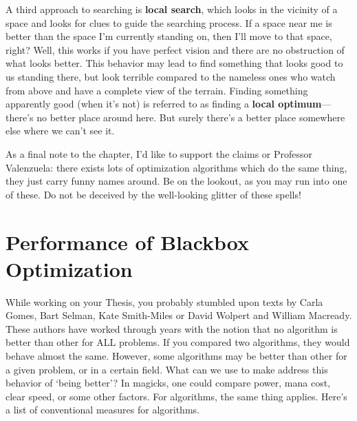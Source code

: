\documentclass[titlepage, letterpaper, oneside]{book}
\newcommand{\spacepls}{\vspace{5mm}}
\newcommand{\magicword}[1]{%
\textbf{#1}\marginnote{\textfrak{#1}}}
\begin{document}
A third approach to searching is \magicword{local search}, which looks in the vicinity of a space and looks for clues to guide the searching process.
If a space near me is better than the space I'm currently standing on, then I'll move to that space, right?
Well, this works if you have perfect vision and there are no obstruction of what looks better.
This behavior may lead to find something that looks good to us standing there, but look terrible compared to the nameless ones who watch from above and have a complete view of the terrain.
Finding something apparently good (when it's not) is referred to as finding a \magicword{local optimum}---there's no better place around here.
But surely there's a better place somewhere else where we can't see it.

As a final note to the chapter, I'd like to support the claims or Professor Valenzuela: there exists lots of optimization algorithms which do the same thing, they just carry funny names around.
Be on the lookout, as you may run into one of these.
Do not be deceived by the well-looking glitter of these spells!

\spacepls

\begin{center}
{\huge \staveXXIII}	
\end{center}



\chapter{Performance of Blackbox Optimization}
\label{ch:blackbox-performance}

While working on your Thesis, you probably stumbled upon texts by Carla Gomes, Bart Selman, Kate Smith-Miles or David Wolpert and William Macready.
These authors have worked through years with the notion that no algorithm is better than other for ALL problems.
If you compared two algorithms, they would behave almost the same.
However, some algorithms may be better than other for a given problem, or in a certain field.
What can we use to make address this behavior of `being better'?
In magicks, one could compare power, mana cost, clear speed, or some other factors.
For algorithms, the same thing applies.
Here's a list of conventional measures for algorithms.
\end{document}
